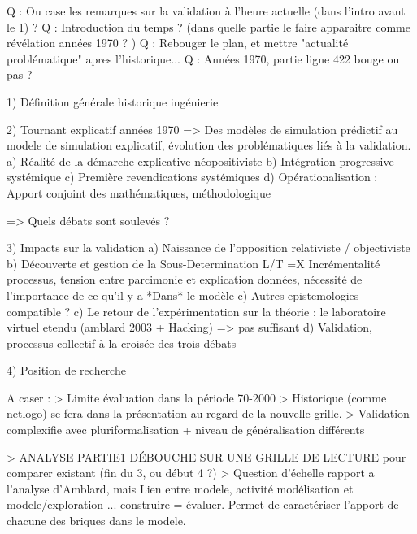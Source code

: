Q : Ou case les remarques sur la validation à l'heure actuelle (dans l'intro avant le 1) ? 
Q : Introduction du temps ? (dans quelle partie le faire apparaitre comme révélation années 1970 ? )
Q : Rebouger le plan, et mettre "actualité problématique" apres l'historique...
Q : Années 1970, partie ligne 422 bouge ou pas ? 

1) Définition générale historique ingénierie

2) Tournant explicatif années 1970
	=> Des modèles de simulation prédictif au modele de simulation explicatif, évolution des problématiques liés à la validation.
	a) Réalité de la démarche explicative néopositiviste
	b) Intégration progressive systémique
	c) Première revendications systémiques
	d) Opérationalisation : Apport conjoint des mathématiques, méthodologique

	=> Quels débats sont soulevés ? 

3) Impacts sur la validation
	a) Naissance de l'opposition relativiste / objectiviste
	b) Découverte et gestion de la Sous-Determination L/T
		=X Incrémentalité processus, tension entre parcimonie et explication données, nécessité de l'importance de ce qu'il y a *Dans* le modèle
	c) Autres epistemologies compatible ?
	c) Le retour de l'expérimentation sur la théorie : le laboratoire virtuel etendu
	    (amblard 2003 + Hacking)
		=> pas suffisant
	d) Validation, processus collectif à la croisée des trois débats 

4) Position de recherche

A caser : 
> Limite évaluation dans la période 70-2000 > Historique (comme netlogo) se fera dans la présentation au regard de la nouvelle grille.
> Validation complexifie avec pluriformalisation + niveau de généralisation différents

> ANALYSE PARTIE1 DÉBOUCHE SUR UNE GRILLE DE LECTURE pour comparer existant (fin du 3, ou début 4 ?)
> Question d'échelle rapport a l'analyse d'Amblard, mais Lien entre modele, activité modélisation et modele/exploration ... construire = évaluer. Permet de caractériser l'apport de chacune des briques dans le modele.




